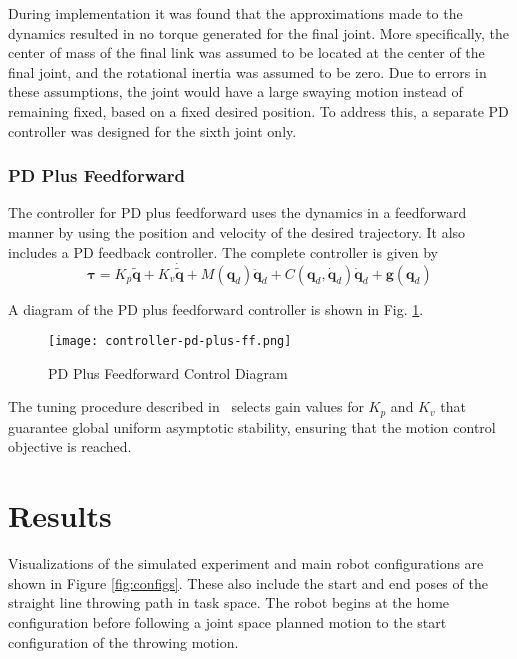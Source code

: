 \documentclass[conference]{IEEEtran}
\begin{document}
During implementation it was found that the approximations made to the dynamics
resulted in no torque generated for the final joint. More specifically, the
center of mass of the final link was assumed to be located at the center of the
final joint, and the rotational inertia was assumed to be zero. Due to errors in
these assumptions, the joint would have a large swaying motion instead of
remaining fixed, based on a fixed desired position. To address this, a separate
PD controller was designed for the sixth joint only.

\subsubsection{PD Plus Feedforward}
The controller for PD plus feedforward uses the dynamics in a feedforward manner
by using the position and velocity of the desired trajectory. It also includes a
PD feedback controller. The complete controller is given by
\begin{equation*}
  \boldsymbol{\tau} = K_p \tilde{\boldsymbol{q}} + K_v \dot{\tilde{\boldsymbol{q}}} + M(\boldsymbol{q}_d)\ddot{\boldsymbol{q}}_d +  C(\boldsymbol{q}_d, \dot{\boldsymbol{q}}_d)\dot{\boldsymbol{q}}_d + \boldsymbol{g}(\boldsymbol{q}_d)
\end{equation*}

A diagram of the PD plus feedforward controller is shown in
Fig. \ref{fig:pd-plus-ff}.

\begin{figure}[!t]
  \texttt{[image: controller-pd-plus-ff.png]}
  \caption{PD Plus Feedforward Control Diagram}
  \label{fig:pd-plus-ff}
\end{figure}

The tuning procedure described in~\cite{kelly2007control} selects gain values for $K_p$
and $K_v$ that guarantee global uniform asymptotic stability, ensuring that the
motion control objective is reached.


\section{Results}
Visualizations of the simulated experiment and main robot configurations are
shown in Figure \ref{fig:configs}. These also include the start and end poses of
the straight line throwing path in task space. The robot begins at the home
configuration before following a joint space planned motion to the start
configuration of the throwing motion.
\end{document}

